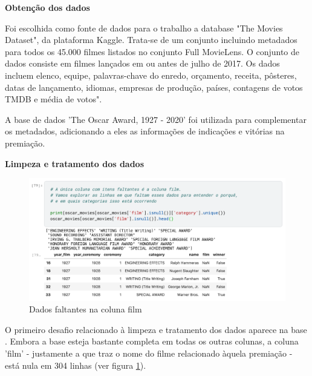             \textbf{Obtenção dos dados}\par

            Foi escolhida como fonte de dados para o trabalho a database "The Movies Dataset", da plataforma Kaggle. Trata-se de um conjunto incluindo metadados para todos os 45.000 filmes listados no conjunto Full MovieLens. O conjunto de dados consiste em filmes lançados em ou antes de julho de 2017. Os dados incluem elenco, equipe, palavras-chave do enredo, orçamento, receita, pôsteres, datas de lançamento, idiomas, empresas de produção, países, contagens de votos TMDB e média de votos".\cite{kaggle2017}\par

            A base de dados 'The Oscar Award, 1927 - 2020' foi utilizada para complementar os metadados, adicionando a eles as informações de indicações e vitórias na premiação.\cite{kaggle2019}\newline

            \textbf{Limpeza e tratamento dos dados}\par
            
            \begin{figure}[htb]
            	\caption{\label{faltantes_film}Dados faltantes na coluna film}
            	\begin{center}
            		\includegraphics[scale=0.5]{faltantes_film.png}
            	\end{center}
            \end{figure}

            O primeiro desafio relacionado à limpeza e tratamento dos dados aparece na base . Embora a base esteja bastante completa em todas os outras colunas, a coluna 'film' - justamente a que traz o nome do filme relacionado àquela premiação - está nula em 304 linhas  (ver figura \ref{faltantes_film}).


